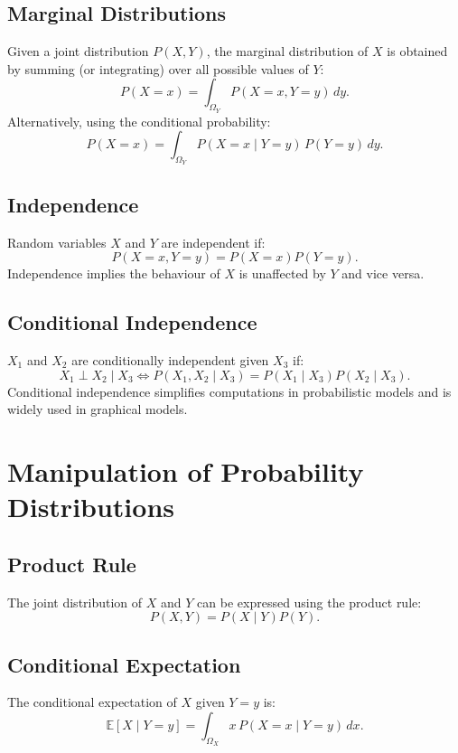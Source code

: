 \subsection{Marginal Distributions}

Given a joint distribution $P(X, Y)$, the marginal distribution of $X$ is obtained by summing (or integrating) over all possible values of $Y$:
\[
    P(X = x) = \int_{\Omega_Y} P(X = x, Y = y) \, dy.
\]
Alternatively, using the conditional probability:
\[
    P(X = x) = \int_{\Omega_Y} P(X = x \mid Y = y) \, P(Y = y) \, dy.
\]

\subsection{Independence}

Random variables $X$ and $Y$ are independent if:
\[
    P(X = x, Y = y) = P(X = x) P(Y = y).
\]
Independence implies the behaviour of $X$ is unaffected by $Y$ and vice versa.

\subsection{Conditional Independence}

$X_1$ and $X_2$ are conditionally independent given $X_3$ if:
\[
    X_1 \perp X_2 \mid X_3 \iff P(X_1, X_2 \mid X_3) = P(X_1 \mid X_3) P(X_2 \mid X_3).
\]
Conditional independence simplifies computations in probabilistic models and is widely used in graphical models.

\section{Manipulation of Probability Distributions}

\subsection{Product Rule}

The joint distribution of $X$ and $Y$ can be expressed using the product rule:
\[
    P(X, Y) = P(X \mid Y) P(Y).
\]

\subsection{Conditional Expectation}

The conditional expectation of $X$ given $Y = y$ is:
\[
    \mathbb{E}[X \mid Y = y] = \int_{\Omega_X} x \, P(X = x \mid Y = y) \, dx.
\]

